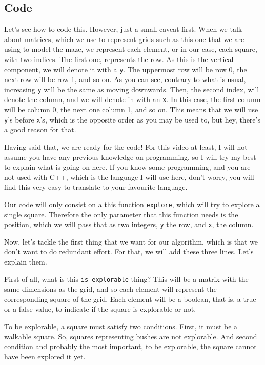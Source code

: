 \documentclass[12pt]{article}
\begin{document}
\subsection{Code}

Let's see how to code this. However, just a small caveat
first. When we talk about matrices, which we use to represent
grids such as this one that we are using to model the maze,
we represent each element, or in our case, each square,
with two indices. The first one, represents the row.
As this is the vertical component, we will denote it
with a \verb|y|. The uppermost row will be row 0, the next row
will be row 1, and so on. As you can see, contrary to what is
usual, increasing \verb|y| will be the same as moving downwards.
Then, the second index, will denote the column, and we will
denote in with an \verb|x|. In this case, the first
column will be column 0, the next one column 1, and so on.
This means that we will use \verb|y|'s before \verb|x|'s,
which is the opposite order as you may be used to, but hey,
there's a good reason for that.

Having said that, we are ready for the code!
For this video at least,
I will not assume you have any previous knowledge on programming,
so I will try my best to explain what is going on here.
If you know some programming, and you are not used with C++,
which is the language I will use here, don't worry,
you will find this very easy to translate to your favourite
language.

Our code will only consist on a this function \verb|explore|,
which will try to explore a single square. Therefore
the only parameter that this function needs is the position,
which we will pass that as two integers, 
\verb|y| the row, and \verb|x|, the column.

Now, let's tackle the first thing that we want for our
algorithm, which is that we don't want to do redundant effort.
For that, we will add these three lines. Let's explain them.

First of all, what is this \verb|is_explorable| thing?
This will be a matrix with the same dimensions as the grid, and
so each element will represent the corresponding square of the
grid. Each element will be a boolean, that is, a true or a false
value, to indicate if the square is explorable or not.

To be explorable, a square must satisfy two conditions.
First, it must be a walkable square. So, squares representing
bushes are not explorable. And second condition and probably
the most important, to be explorable, the square cannot
have been explored it yet.
\end{document}
